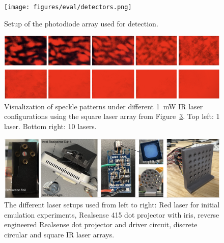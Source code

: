 \begin{figure}[t]
\centering
\texttt{[image: figures/eval/detectors.png]}
\caption{Setup of the photodiode array used for detection.}
\label{fig:detectors}
\end{figure}

\begin{figure}[t]
\centering
\includegraphics[width=\textwidth]{figures/eval/speckles}
\caption{Visualization of speckle patterns under different 1~mW IR laser configurations using the square laser array from Figure~\ref{fig:lasers}. Top left: 1 laser. Bottom right: 10 lasers.}
\label{fig:speckles}
\end{figure}

\begin{figure}[t]
\centering
\includegraphics[width=\textwidth]{figures/eval/lasers}
\caption{The different laser setups used from left to right: Red laser for initial emulation experiments, Realsense 415 dot projector with iris, reverse engineered Realsense dot projector and driver circuit, discrete circular and square IR laser arrays.}
\label{fig:lasers}
\end{figure}
